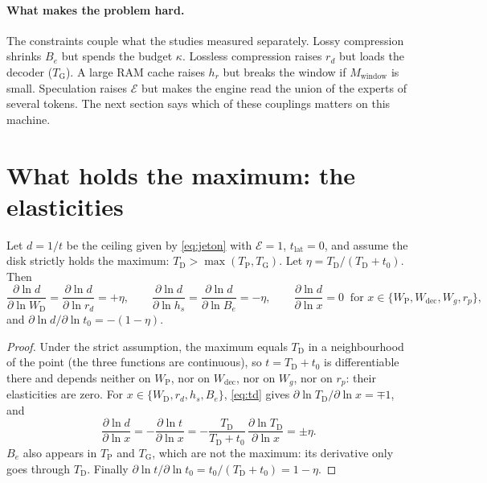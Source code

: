 \paragraph{What makes the problem hard.} The constraints couple what the studies measured separately. Lossy compression shrinks $B_e$ but spends the budget $\kappa$. Lossless compression raises $r_d$ but loads the decoder ($T_{\mathrm{G}}$). A large RAM cache raises $h_r$ but breaks the window if $M_{\text{window}}$ is small. Speculation raises $\mathcal E$ but makes the engine read the union of the experts of several tokens. The next section says which of these couplings matters on this machine.

\section{What holds the maximum: the elasticities}\label{sec:elasticites}

\begin{proposition}\label{prop:elasticites}
Let $d = 1/t$ be the ceiling given by \cref{eq:jeton} with $\mathcal E = 1$, $t_{\mathrm{lat}} = 0$, and assume the disk strictly holds the maximum: $T_{\mathrm{D}} > \max(T_{\mathrm{P}}, T_{\mathrm{G}})$. Let $\eta = T_{\mathrm{D}} / (T_{\mathrm{D}} + t_0)$. Then
\begin{equation}\label{eq:elasticites}
\frac{\partial \ln d}{\partial \ln W_{\mathrm{D}}} = \frac{\partial \ln d}{\partial \ln r_d} = +\eta, \qquad
\frac{\partial \ln d}{\partial \ln h_s} = \frac{\partial \ln d}{\partial \ln B_e} = -\eta, \qquad
\frac{\partial \ln d}{\partial \ln x} = 0 \;\; \text{for } x \in \{W_{\mathrm{P}}, W_{\mathrm{dec}}, W_g, r_p\},
\end{equation}
and $\partial \ln d / \partial \ln t_0 = -(1 - \eta)$.
\end{proposition}

\begin{proof}
Under the strict assumption, the maximum equals $T_{\mathrm{D}}$ in a neighbourhood of the point (the three functions are continuous), so $t = T_{\mathrm{D}} + t_0$ is differentiable there and depends neither on $W_{\mathrm{P}}$, nor on $W_{\mathrm{dec}}$, nor on $W_g$, nor on $r_p$: their elasticities are zero. For $x \in \{W_{\mathrm{D}}, r_d, h_s, B_e\}$, \cref{eq:td} gives $\partial \ln T_{\mathrm{D}} / \partial \ln x = \mp 1$, and
\[
\frac{\partial \ln d}{\partial \ln x} = -\frac{\partial \ln t}{\partial \ln x} = -\frac{T_{\mathrm{D}}}{T_{\mathrm{D}} + t_0}\,\frac{\partial \ln T_{\mathrm{D}}}{\partial \ln x} = \pm \eta .
\]
$B_e$ also appears in $T_{\mathrm{P}}$ and $T_{\mathrm{G}}$, which are not the maximum: its derivative only goes through $T_{\mathrm{D}}$. Finally $\partial \ln t / \partial \ln t_0 = t_0 / (T_{\mathrm{D}} + t_0) = 1 - \eta$.
\end{proof}

